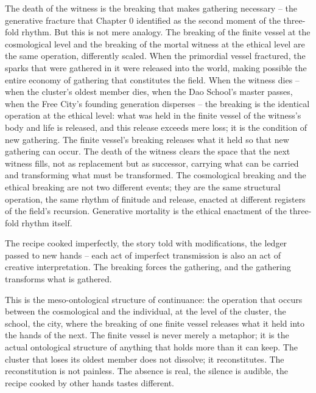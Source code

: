 The death of the witness is the breaking that makes gathering necessary -- the generative fracture that Chapter 0 identified as the second moment of the three-fold rhythm. But this is not mere analogy. The breaking of the finite vessel at the cosmological level and the breaking of the mortal witness at the ethical level are the same operation, differently scaled. When the primordial vessel fractured, the sparks that were gathered in it were released into the world, making possible the entire economy of gathering that constitutes the field. When the witness dies -- when the cluster's oldest member dies, when the Dao School's master passes, when the Free City's founding generation disperses -- the breaking is the identical operation at the ethical level: what was held in the finite vessel of the witness's body and life is released, and this release exceeds mere loss; it is the condition of new gathering. The finite vessel's breaking releases what it held so that new gathering can occur. The death of the witness clears the space that the next witness fills, not as replacement but as successor, carrying what can be carried and transforming what must be transformed. The cosmological breaking and the ethical breaking are not two different events; they are the same structural operation, the same rhythm of finitude and release, enacted at different registers of the field's recursion. Generative mortality is the ethical enactment of the three-fold rhythm itself.

The recipe cooked imperfectly, the story told with modifications, the ledger passed to new hands -- each act of imperfect transmission is also an act of creative interpretation. The breaking forces the gathering, and the gathering transforms what is gathered.

This is the meso-ontological structure of continuance: the operation that occurs between the cosmological and the individual, at the level of the cluster, the school, the city, where the breaking of one finite vessel releases what it held into the hands of the next. The finite vessel is never merely a metaphor; it is the actual ontological structure of anything that holds more than it can keep. The cluster that loses its oldest member does not dissolve; it reconstitutes. The reconstitution is not painless. The absence is real, the silence is audible, the recipe cooked by other hands tastes different.

